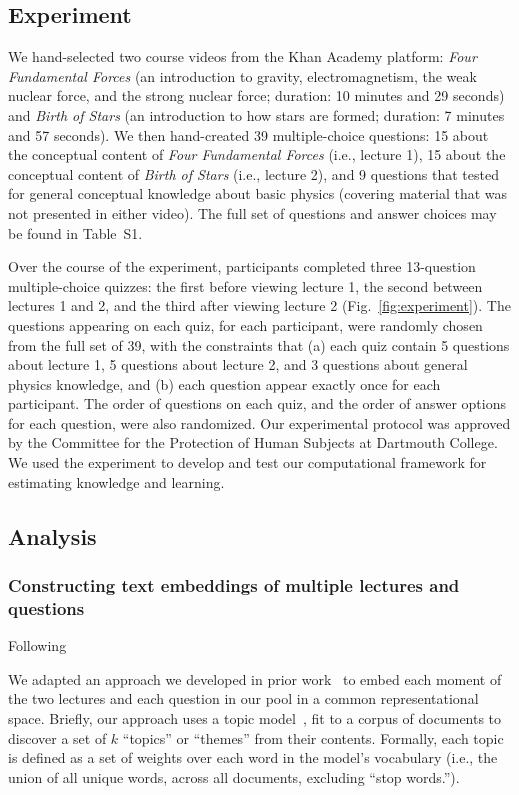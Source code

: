 \documentclass[10pt]{article}
\newcommand{\questions}{S1}
\begin{document}
\subsection*{Experiment}\label{subsec:experiment}

We hand-selected two course videos from the Khan Academy platform: \textit{Four
Fundamental Forces} (an introduction to gravity, electromagnetism, the weak
nuclear force, and the strong nuclear force; duration: 10 minutes and 29
seconds) and \textit{Birth of Stars} (an introduction to how stars are formed;
duration: 7 minutes and 57 seconds). We then hand-created 39 multiple-choice
questions: 15 about the conceptual content of \textit{Four Fundamental Forces} (i.e., lecture 1),
15 about the conceptual content of \textit{Birth of Stars} (i.e., lecture 2), and 9
questions that tested for general conceptual knowledge about basic physics
(covering material that was not presented in either video). The full set of
questions and answer choices may be found in Table~\questions.

Over the course of the experiment, participants completed three 13-question
multiple-choice quizzes: the first before viewing lecture 1, the second between
lectures 1 and 2, and the third after viewing lecture 2 (Fig.~\ref{fig:experiment}).
The questions appearing on each quiz, for each participant, were randomly
chosen from the full set of 39, with the constraints that (a) each quiz contain 5
questions about lecture 1, 5 questions about lecture 2, and 3 questions about general physics knowledge, and
(b) each question appear exactly once for each participant. The order of questions on each quiz,
and the order of answer options for each question, were also randomized. Our
experimental protocol was approved by the Committee for the Protection of
Human Subjects at Dartmouth College.  We used the experiment to develop
and test our computational framework for estimating knowledge and learning.

\subsection*{Analysis}

\subsubsection*{Constructing text embeddings of multiple lectures and questions}\label{subsec:topic-modeling}
Following \citet{HeusEtal21}

We adapted an approach we developed in prior work~\citep{HeusEtal21} to embed
each moment of the two lectures and each question in our pool in a common representational space.
Briefly, our approach uses a topic model~\citep[Latent Dirichlet Allocation;][]{BleiEtal03},
fit to a corpus of documents to discover a set of $k$ ``topics'' or ``themes'' from their contents.
Formally, each topic is defined as a set of weights over each word in the model's vocabulary
(i.e., the union of all unique words, across all documents, excluding ``stop
words.'').
\end{document}
